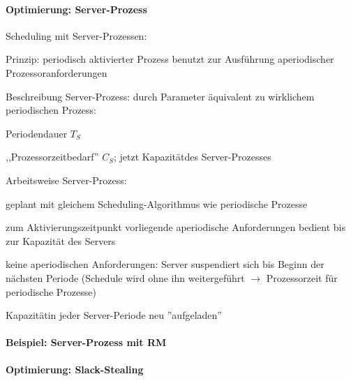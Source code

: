 \documentclass[a4paper]{article}
\begin{document}
\begin{multicols}{3}
    \paragraph{Optimierung:
        Server-Prozess}

    \begin{itemize*}
        \item Scheduling mit Server-Prozessen:
        \begin{itemize*}
            \item Prinzip: periodisch aktivierter Prozess benutzt zur Ausführung aperiodischer Prozessoranforderungen
            \item Beschreibung Server-Prozess: durch Parameter äquivalent zu wirklichem periodischen Prozess: \begin{itemize*} \item Periodendauer $T_S$ \item ,,Prozessorzeitbedarf'' $C_S$; jetzt Kapazitätdes Server-Prozesses \end{itemize*}
            \item Arbeitsweise Server-Prozess: \begin{itemize*} \item geplant mit gleichem Scheduling-Algorithmus wie periodische Prozesse \item zum Aktivierungszeitpunkt vorliegende aperiodische Anforderungen bedient bis zur Kapazität des Servers \item keine aperiodischen Anforderungen: Server suspendiert sich bis Beginn der nächsten Periode (Schedule wird ohne ihn weitergeführt $\rightarrow$ Prozessorzeit für periodische Prozesse) \item Kapazitätin jeder Server-Periode neu ''aufgeladen'' \end{itemize*}
        \end{itemize*}
    \end{itemize*}


    \paragraph{Beispiel: Server-Prozess mit
        RM}



    \paragraph{Optimierung:
        Slack-Stealing}


\end{multicols}
\end{document}
